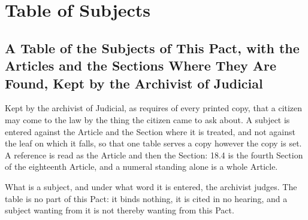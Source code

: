 \chapter{Table of Subjects}
\label{back:subjects}

\section*{A Table of the Subjects of This Pact, with the Articles and the Sections Where They Are Found, Kept by the Archivist of Judicial}

\noindent Kept by the archivist of Judicial, as  requires of every printed copy, that a citizen may come to the law by the thing the citizen came to ask about. A subject is entered against the Article and the Section where it is treated, and not against the leaf on which it falls, so that one table serves a copy however the copy is set. A reference is read as the Article and then the Section: \textsc{18.4} is the fourth Section of the eighteenth Article, and a numeral standing alone is a whole Article.

\vspace{4pt}
\noindent What is a subject, and under what word it is entered, the archivist judges. The table is no part of this Pact: it binds nothing, it is cited in no hearing, and a subject wanting from it is not thereby wanting from this Pact.

\vspace{8pt}


